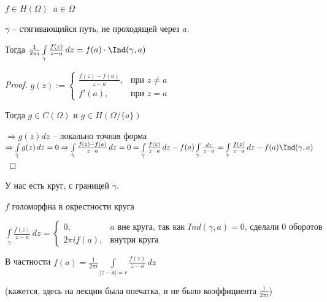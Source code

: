 \begin{theorem}\thmslashn
	
	$f\in H(\Omega) \;\; a\in \Omega$
	
	$\gamma$ -- стягивающийся путь, не проходящей через $a$. 
	
	Тогда $\frac{1}{2\pi i}\int\limits_\gamma \frac{f(z)}{z-a}\,dz = f(a)\cdot \Ind(\gamma, a)$
	
\end{theorem}

\begin{proof}\thmslashn
	
	$
	g(z) :=
	\begin{cases}
		\frac{f(z) - f(a)}{z-a}, & \text{при } z \not = a \\
		f'(a), & \text{при } z = a
	\end{cases}
	$
	
	Тогда $g \in C(\Omega)$ и $g\in H(\Omega/\{a\})$
	
	$\Rightarrow g(z)dz$ -- локально точная форма $\Rightarrow \int\limits_\gamma g(z)\,dz = 0 \Rightarrow \int\limits_\gamma \frac{f(z) - f(a)}{z-a}\,dz = 0 = \int\limits_\gamma \frac{f(z)}{z-a}\,dz - f(a) \int\limits_\gamma \frac{dz}{z-a} = \int\limits_\gamma \frac{f(z)}{z-a}\,dz - f(a) \Ind(\gamma, a)$
\end{proof}

\begin{example}\thmslashn
	
	У нас есть круг, с границей $\gamma$. 
	
	$f$ голоморфна в окрестности круга
	
	$\int\limits_\gamma \frac{f(z)}{z-a}\,dz = 
	\begin{cases}
        0, & a \text{ вне круга, так как } Ind(\gamma, a) = 0 \text{, сделали 0 оборотов}\\
	2\pi i f(a), & \text{внутри круга}
	\end{cases}$
	
    В частности $f(a) = \frac{1}{2\pi i} \int\limits_{|z-a| = r} \frac{f(z)}{z-a}\,dz$

    (кажется, здесь на лекции была опечатка, и не было коэффициента $\frac{1}{2\pi i}$)
\end{example}